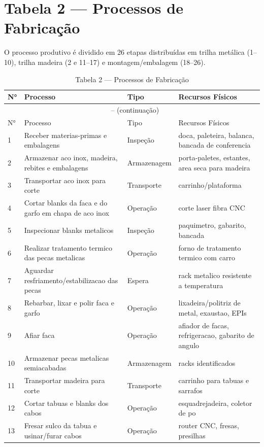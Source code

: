 \documentclass[12pt,a4paper,oneside,english,brazil]{abntex2}
\begin{document}
\chapter{Tabela 2 --- Processos de Fabricação}
O processo produtivo é dividido em 26 etapas distribuídas em trilha metálica (1--10), trilha madeira (2 e 11--17) e montagem/embalagem (18--26).

\begin{longtable}{p{0.6cm}p{5.5cm}p{2.8cm}p{5.5cm}}
\caption{Tabela 2 --- Processos de Fabricação}\label{tab:processos}\\
\toprule
N° & Processo & Tipo & Recursos Físicos \\
\midrule
\endfirsthead
\multicolumn{4}{c}{\tablename\ \thetable{} -- (continuação)}\\
\toprule N° & Processo & Tipo & Recursos Físicos \\\midrule
\endhead
  1 & Receber materias-primas e embalagens & Inspeção & doca, paleteira, balanca, bancada de conferencia \\
  2 & Armazenar aco inox, madeira, rebites e embalagens & Armazenagem & porta-paletes, estantes, area seca para madeira \\
  3 & Transportar aco inox para corte & Transporte & carrinho/plataforma \\
  4 & Cortar blanks da faca e do garfo em chapa de aco inox & Operação & corte laser fibra CNC \\
  5 & Inspecionar blanks metalicos & Inspeção & paquimetro, gabarito, bancada \\
  6 & Realizar tratamento termico das pecas metalicas & Operação & forno de tratamento termico com carro \\
  7 & Aguardar resfriamento/estabilizacao das pecas & Espera & rack metalico resistente a temperatura \\
  8 & Rebarbar, lixar e polir faca e garfo & Operação & lixadeira/politriz de metal, exaustao, EPIs \\
  9 & Afiar faca & Operação & afiador de facas, refrigeracao, gabarito de angulo \\
  10 & Armazenar pecas metalicas semiacabadas & Armazenagem & racks identificados \\
  11 & Transportar madeira para corte & Transporte & carrinho para tabuas e sarrafos \\
  12 & Cortar tabuas e blanks dos cabos & Operação & esquadrejadeira, coletor de po \\
  13 & Fresar sulco da tabua e usinar/furar cabos & Operação & router CNC, fresas, presilhas \\

\end{longtable}
\end{document}
